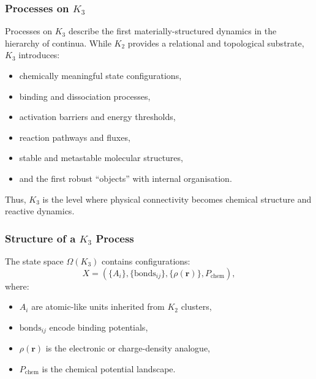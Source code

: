 

\subsubsection{Processes on \texorpdfstring{$K_3$}{K_3}}
\label{sec:processes-k3}

Processes on $K_3$ describe the first materially-structured dynamics in 
the hierarchy of continua. While $K_2$ provides a relational and 
topological substrate, $K_3$ introduces:
\begin{itemize}
    \item chemically meaningful state configurations,
    \item binding and dissociation processes,
    \item activation barriers and energy thresholds,
    \item reaction pathways and fluxes,
    \item stable and metastable molecular structures,
    \item and the first robust ``objects'' with internal organisation.
\end{itemize}

Thus, $K_3$ is the level where physical connectivity becomes chemical 
structure and reactive dynamics.

\subsubsection{Structure of a \texorpdfstring{$K_3$}{K_3} Process}

The state space $\Omega(K_3)$ contains configurations:
\[
X = (\{A_i\}, \{\text{bonds}_{ij}\}, \{\rho(\mathbf{r})\}, P_\text{chem}),
\]
where:
\begin{itemize}
    \item $A_i$ are atomic-like units inherited from $K_2$ clusters,
    \item $\text{bonds}_{ij}$ encode binding potentials,
    \item $\rho(\mathbf{r})$ is the electronic or charge-density analogue,
    \item $P_\text{chem}$ is the chemical potential landscape.
\end{itemize}

